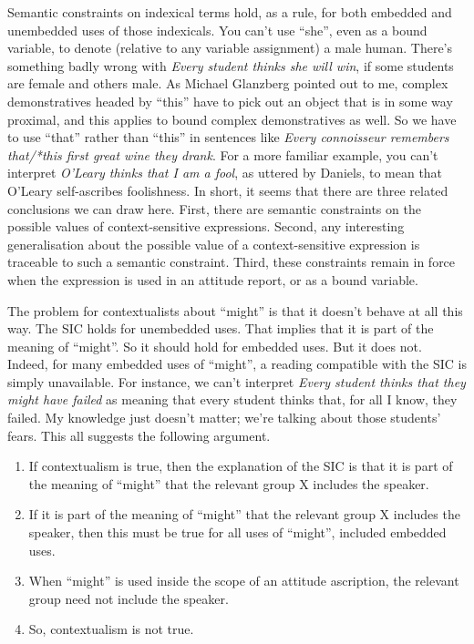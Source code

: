 \documentclass[
  11pt,
  letterpaper,
  DIV=11,
  numbers=noendperiod,
  twoside]{scrartcl}
\providecommand{\tightlist}{%
  \setlength{\itemsep}{0pt}\setlength{\parskip}{0pt}}
\begin{document}
Semantic constraints on indexical terms hold, as a rule, for both
embedded and unembedded uses of those indexicals. You can't use ``she'',
even as a bound variable, to denote (relative to any variable
assignment) a male human. There's something badly wrong with \emph{Every
student thinks she will win}, if some students are female and others
male. As Michael Glanzberg pointed out to me, complex demonstratives
headed by ``this'' have to pick out an object that is in some way
proximal, and this applies to bound complex demonstratives as well. So
we have to use ``that'' rather than ``this'' in sentences like
\emph{Every connoisseur remembers that/*this first great wine they
drank}. For a more familiar example, you can't interpret \emph{O'Leary
thinks that I am a fool}, as uttered by Daniels, to mean that O'Leary
self-ascribes foolishness. In short, it seems that there are three
related conclusions we can draw here. First, there are semantic
constraints on the possible values of context-sensitive expressions.
Second, any interesting generalisation about the possible value of a
context-sensitive expression is traceable to such a semantic constraint.
Third, these constraints remain in force when the expression is used in
an attitude report, or as a bound variable.

The problem for contextualists about ``might'' is that it doesn't behave
at all this way. The SIC holds for unembedded uses. That implies that it
is part of the meaning of ``might''. So it should hold for embedded
uses. But it does not. Indeed, for many embedded uses of ``might'', a
reading compatible with the SIC is simply unavailable. For instance, we
can't interpret \emph{Every student thinks that they might have failed}
as meaning that every student thinks that, for all I know, they failed.
My knowledge just doesn't matter; we're talking about those students'
fears. This all suggests the following argument.

\begin{enumerate}
\def\labelenumi{\arabic{enumi}.}
\tightlist
\item
  If contextualism is true, then the explanation of the SIC is that it
  is part of the meaning of ``might'' that the relevant group X includes
  the speaker.
\item
  If it is part of the meaning of ``might'' that the relevant group X
  includes the speaker, then this must be true for all uses of
  ``might'', included embedded uses.
\item
  When ``might'' is used inside the scope of an attitude ascription, the
  relevant group need not include the speaker.
\item
  So, contextualism is not true.
\end{enumerate}
\end{document}
